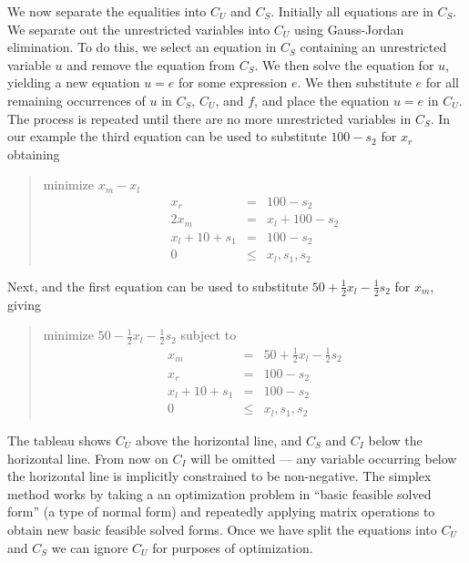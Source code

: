 \documentclass{article}
\begin{document}
We now separate the equalities into $C_U$ and $C_S$\@.
Initially all equations are in $C_S$\@.  We separate out the
unrestricted variables into $C_U$ using Gauss-Jordan elimination.  To do
this, we select an equation in $C_S$ containing an unrestricted variable
$u$ and remove the equation
from $C_S$\@.  We then solve the equation for $u$, yielding
a new equation $u=e$ for some expression $e$.  We then substitute $e$ for
all remaining occurrences of $u$ in $C_S$, $C_U$, and $f$,
and place the equation $u=e$ in
$C_U$\@.  The process is repeated until there are no more unrestricted
variables in $C_S$\@.  In our example the third equation can be used to
substitute $100 - s_2$ for $x_r$ 
obtaining
\begin{quote}\vspace*{-1ex}
minimize $x_m - x_l$ 
$$
\begin{array}{rcl}
x_r &= & 100 - s_2 \\ \hline
2 x_m & = & x_l + 100 - s_2 \\
x_l + 10 + s_1& = & 100 - s_2 \\
0 &\leq & x_l, s_1, s_2
\end{array}
$$
\end{quote}\vspace{-0.9ex}
Next, 
and the first equation can be used to 
substitute $50 + \frac{1}{2}x_l - \frac{1}{2} s_2$ 
for $x_m$, giving 
\begin{quote}\vspace*{-1ex}
minimize $50 - \frac{1}{2}x_l - \frac{1}{2} s_2$ 
subject to 
$$
\begin{array}{rcl}
x_m & = & 50 + \frac{1}{2} x_l - \frac{1}{2} s_2 \\ 
x_r &= & 100 - s_2 \\ \hline
x_l + 10 + s_1& = &100 - s_2 \\
0 &\leq & x_l, s_1, s_2
\end{array}
$$
\end{quote}\vspace{-0.9ex}
The tableau shows $C_U$ above the horizontal line,
and $C_S$ and $C_I$ below the horizontal line.  From now 
on $C_I$ will be omitted --- any variable occurring below the horizontal
line is implicitly constrained to be non-negative.
The simplex method works by taking a an optimization problem in ``basic
feasible solved form'' (a type of normal form) and repeatedly applying
matrix operations to obtain new basic feasible solved forms.  Once we
have split the equations into $C_U$ and $C_S$ we can ignore $C_U$ for
purposes of optimization. 
\end{document}
